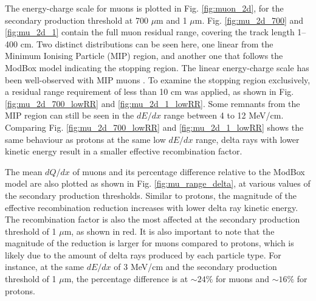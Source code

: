 
The energy-charge scale for muons is plotted in Fig. \ref{fig:muon_2d}, for the secondary production threshold at 700 $\mu$m and 1 $\mu$m.
Fig. \ref{fig:mu_2d_700} and \ref{fig:mu_2d_1} contain the full muon residual range, covering the track length 1--400 cm.
Two distinct distributions can be seen here, one linear from the Minimum Ionising Particle (MIP) region, and another one that follows the ModBox model indicating the stopping region. 
The linear energy-charge scale has been well-observed with MIP muons \cite{uboone_calib}.
To examine the stopping region exclusively, a residual range requirement of less than 10 cm was applied, as shown in Fig. \ref{fig:mu_2d_700_lowRR} and \ref{fig:mu_2d_1_lowRR}.
Some remnants from the MIP region can still be seen in the $dE/dx$ range between 4 to 12 MeV/cm.
Comparing Fig. \ref{fig:mu_2d_700_lowRR} and \ref{fig:mu_2d_1_lowRR} shows the same behaviour as protons at the same low $dE/dx$ range, delta rays with lower kinetic energy result in a smaller effective recombination factor. 

The mean $dQ/dx$ of muons and its percentage difference relative to the ModBox model are also plotted as shown in Fig. \ref{fig:mu_range_delta}, at various values of the secondary production thresholds.
Similar to protons, the magnitude of the effective recombination reduction increases with lower delta ray kinetic energy.
The recombination factor is also the most affected at the secondary production threshold of 1 $\mu$m, as shown in red.
It is also important to note that the magnitude of the reduction is larger for muons compared to protons, which is likely due to the amount of delta rays produced by each particle type.
For instance, at the same $dE/dx$ of 3 MeV/cm and the secondary production threshold of 1 $\mu$m, the percentage difference is at $\sim 24\%$ for muons and $\sim16\%$ for protons.  

